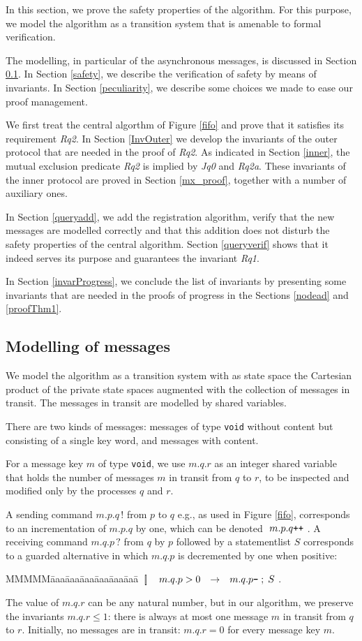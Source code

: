 \documentclass[10pt]{article} \usepackage[english]{babel}
\newenvironment{tab}{\begin{tabbing}
MMMMM\=aaa\=aaa\=aaa\=aaa\=aaa\=aaa\= \kill}{\end{tabbing}}
\def\bar   {\mbox{$\,[ \! ]\,$}}
\def\S #1/{\mbox {\textsl{#1}}}
\def\T #1/{\mbox {\texttt{#1}}}
\def\TO     {\mbox{$\quad\to\quad$}}
\begin{document}
In this section, we prove the safety properties of the algorithm.  For
this purpose, we model the algorithm as a transition system that is
amenable to formal verification.

The modelling, in particular of the asynchronous messages, is
discussed in Section \ref{channels}. In Section \ref{safety}, we
describe the verification of safety by means of invariants.  In
Section \ref{peculiarity}, we describe some choices we made to ease
our proof management.

We first treat the central algorthm of Figure \ref{fifo} and prove
that it satisfies its requirement \S Rq2/.  In Section \ref{InvOuter}
we develop the invariants of the outer protocol that are needed in the
proof of \S Rq2/.  As indicated in Section \ref{inner}, the mutual
exclusion predicate \S Rq2/ is implied by \S Jq0/ and \S Rq2a/. These
invariants of the inner protocol are proved in Section \ref{mx_proof},
together with a number of auxiliary ones.

In Section \ref{queryadd}, we add the registration algorithm, verify
that the new messages are modelled correctly and that this addition
does not disturb the safety properties of the central algorithm.
Section \ref{queryverif} shows that it indeed serves its purpose and
guarantees the invariant \S Rq1/.

In Section \ref{invarProgress}, we conclude the list of invariants by
presenting some invariants that are needed in the proofs of progress
in the Sections \ref{nodead} and \ref{proofThm1}.

\subsection{Modelling of messages} \label {channels}

We model the algorithm as a transition system with as state space the
Cartesian product of the private state spaces augmented with the
collection of messages in transit.  The messages in transit are
modelled by shared variables.

There are two kinds of messages: messages of type \T void/ without
content but consisting of a single key word, and messages with content.

For a message key $m$ of type \T void/, we use $m.q.r$ as an integer
shared variable that holds the number of messages $m$ in transit from
$q$ to $r$, to be inspected and modified only by the processes $q$ and
$r$.

A sending command $m.p.q\,!$ from $p$ to $q$ e.g., as used in Figure
\ref{fifo}, corresponds to an incrementation of $m.p.q$ by one, which
can be denoted $ \ m.p.q\T ++/ \ $.  A receiving command $m.q.p\,?$
from $q$ by $p$ followed by a statementlist $S$ corresponds to a
guarded alternative in which $m.q.p$ is decremented by one when
positive:
\begin{tab}
\> $\bar\quad m.q.p > 0 \TO m.q.p\T --/ \;;\; S$ .
\end{tab}
The value of $m.q.r$ can be any natural number, but in our algorithm,
we preserve the invariants $m.q.r \leq 1$: there is always at most one
message $m$ in transit from $q$ to $r$.  Initially, no messages are in
transit: $m.q.r=0$ for every message key $m$.
\end{document}
